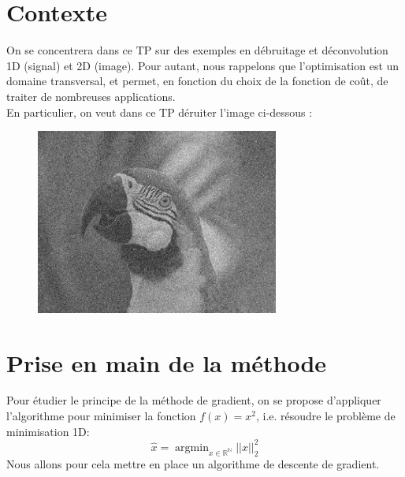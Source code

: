 \documentclass{article}
\DeclareMathOperator*{\argmin}{argmin}
\begin{document}
\vspace*{4mm}
\renewcommand{\thesection}{\Roman{section}}

\section{Contexte}

On se concentrera dans ce TP sur des exemples en débruitage et déconvolution 1D (signal) et 2D
(image). Pour autant, nous rappelons que l’optimisation est un domaine transversal, et permet, en
fonction du choix de la fonction de coût, de traiter de nombreuses applications.\\
En particulier, on veut dans ce TP déruiter l’image ci-dessous :
\begin{figure}[h]
\includegraphics[width=8cm]{perroquet_original.png}
\centering
\end{figure}

\clearpage

\section{Prise en main de la méthode}

Pour étudier le principe de la méthode de gradient, on se propose d’appliquer l’algorithme pour
minimiser la fonction $f(x) = x^2 $, i.e. résoudre le problème de minimisation 1D:\\
\begin{equation}
\hat{x} = \argmin_{x \in \mathbb{R^N}}||x||_2^2
\label{eq:AR(M)}
\end{equation}
Nous allons pour cela mettre en place un algorithme de descente de gradient. 
\end{document}

